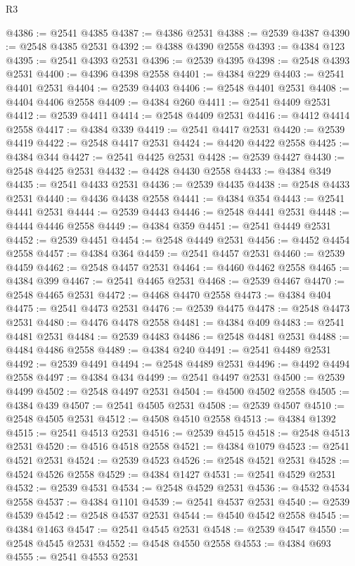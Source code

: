 \begin{lexlean}{R3}
\begin{coremodule}
@4386 := @2541 @4385
@4387 := @4386 @2531
@4388 := @2539 @4387
@4390 := @2548 @4385 @2531
@4392 := @4388 @4390 @2558
@4393 := @4384 @123
@4395 := @2541 @4393 @2531
@4396 := @2539 @4395
@4398 := @2548 @4393 @2531
@4400 := @4396 @4398 @2558
@4401 := @4384 @229
@4403 := @2541 @4401 @2531
@4404 := @2539 @4403
@4406 := @2548 @4401 @2531
@4408 := @4404 @4406 @2558
@4409 := @4384 @260
@4411 := @2541 @4409 @2531
@4412 := @2539 @4411
@4414 := @2548 @4409 @2531
@4416 := @4412 @4414 @2558
@4417 := @4384 @339
@4419 := @2541 @4417 @2531
@4420 := @2539 @4419
@4422 := @2548 @4417 @2531
@4424 := @4420 @4422 @2558
@4425 := @4384 @344
@4427 := @2541 @4425 @2531
@4428 := @2539 @4427
@4430 := @2548 @4425 @2531
@4432 := @4428 @4430 @2558
@4433 := @4384 @349
@4435 := @2541 @4433 @2531
@4436 := @2539 @4435
@4438 := @2548 @4433 @2531
@4440 := @4436 @4438 @2558
@4441 := @4384 @354
@4443 := @2541 @4441 @2531
@4444 := @2539 @4443
@4446 := @2548 @4441 @2531
@4448 := @4444 @4446 @2558
@4449 := @4384 @359
@4451 := @2541 @4449 @2531
@4452 := @2539 @4451
@4454 := @2548 @4449 @2531
@4456 := @4452 @4454 @2558
@4457 := @4384 @364
@4459 := @2541 @4457 @2531
@4460 := @2539 @4459
@4462 := @2548 @4457 @2531
@4464 := @4460 @4462 @2558
@4465 := @4384 @399
@4467 := @2541 @4465 @2531
@4468 := @2539 @4467
@4470 := @2548 @4465 @2531
@4472 := @4468 @4470 @2558
@4473 := @4384 @404
@4475 := @2541 @4473 @2531
@4476 := @2539 @4475
@4478 := @2548 @4473 @2531
@4480 := @4476 @4478 @2558
@4481 := @4384 @409
@4483 := @2541 @4481 @2531
@4484 := @2539 @4483
@4486 := @2548 @4481 @2531
@4488 := @4484 @4486 @2558
@4489 := @4384 @240
@4491 := @2541 @4489 @2531
@4492 := @2539 @4491
@4494 := @2548 @4489 @2531
@4496 := @4492 @4494 @2558
@4497 := @4384 @434
@4499 := @2541 @4497 @2531
@4500 := @2539 @4499
@4502 := @2548 @4497 @2531
@4504 := @4500 @4502 @2558
@4505 := @4384 @439
@4507 := @2541 @4505 @2531
@4508 := @2539 @4507
@4510 := @2548 @4505 @2531
@4512 := @4508 @4510 @2558
@4513 := @4384 @1392
@4515 := @2541 @4513 @2531
@4516 := @2539 @4515
@4518 := @2548 @4513 @2531
@4520 := @4516 @4518 @2558
@4521 := @4384 @1079
@4523 := @2541 @4521 @2531
@4524 := @2539 @4523
@4526 := @2548 @4521 @2531
@4528 := @4524 @4526 @2558
@4529 := @4384 @1427
@4531 := @2541 @4529 @2531
@4532 := @2539 @4531
@4534 := @2548 @4529 @2531
@4536 := @4532 @4534 @2558
@4537 := @4384 @1101
@4539 := @2541 @4537 @2531
@4540 := @2539 @4539
@4542 := @2548 @4537 @2531
@4544 := @4540 @4542 @2558
@4545 := @4384 @1463
@4547 := @2541 @4545 @2531
@4548 := @2539 @4547
@4550 := @2548 @4545 @2531
@4552 := @4548 @4550 @2558
@4553 := @4384 @693
@4555 := @2541 @4553 @2531

\end{coremodule}
\end{lexlean}

